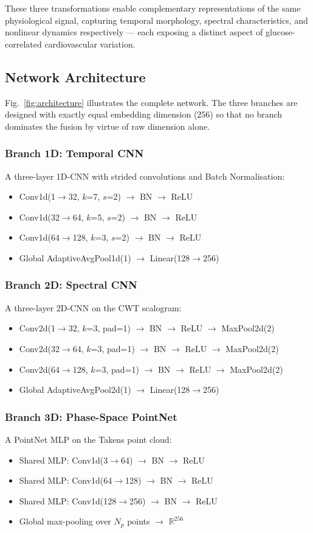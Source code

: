 \documentclass[conference]{IEEEtran}
\begin{document}
These three transformations enable complementary representations of the same
physiological signal, capturing temporal morphology, spectral characteristics,
and nonlinear dynamics respectively --- each exposing a distinct aspect of
glucose-correlated cardiovascular variation.

\subsection{Network Architecture}

Fig.~\ref{fig:architecture} illustrates the complete network.  The three
branches are designed with exactly equal embedding dimension (256) so that
no branch dominates the fusion by virtue of raw dimension alone.

\subsubsection{Branch 1D: Temporal CNN}
A three-layer 1D-CNN with strided convolutions and Batch Normalisation:
\begin{itemize}
  \item Conv1d(1$\to$32, $k$=7, $s$=2) $\to$ BN $\to$ ReLU
  \item Conv1d(32$\to$64, $k$=5, $s$=2) $\to$ BN $\to$ ReLU
  \item Conv1d(64$\to$128, $k$=3, $s$=2) $\to$ BN $\to$ ReLU
  \item Global AdaptiveAvgPool1d(1) $\to$ Linear(128$\to$256)
\end{itemize}

\subsubsection{Branch 2D: Spectral CNN}
A three-layer 2D-CNN on the CWT scalogram:
\begin{itemize}
  \item Conv2d(1$\to$32, $k$=3, pad=1) $\to$ BN $\to$ ReLU $\to$ MaxPool2d(2)
  \item Conv2d(32$\to$64, $k$=3, pad=1) $\to$ BN $\to$ ReLU $\to$ MaxPool2d(2)
  \item Conv2d(64$\to$128, $k$=3, pad=1) $\to$ BN $\to$ ReLU $\to$ MaxPool2d(2)
  \item Global AdaptiveAvgPool2d(1) $\to$ Linear(128$\to$256)
\end{itemize}

\subsubsection{Branch 3D: Phase-Space PointNet}
A PointNet MLP on the Takens point cloud:
\begin{itemize}
  \item Shared MLP: Conv1d(3$\to$64) $\to$ BN $\to$ ReLU
  \item Shared MLP: Conv1d(64$\to$128) $\to$ BN $\to$ ReLU
  \item Shared MLP: Conv1d(128$\to$256) $\to$ BN $\to$ ReLU
  \item Global max-pooling over $N_p$ points $\to$ $\mathbb{R}^{256}$
\end{itemize}
\end{document}
